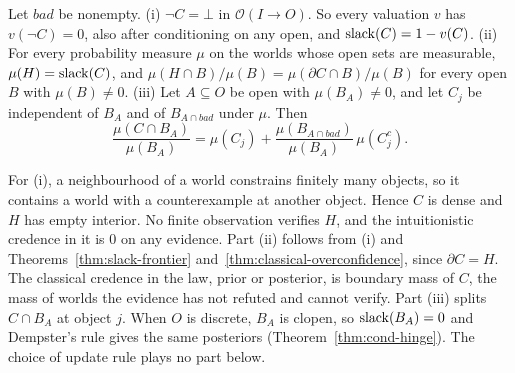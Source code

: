 \begin{theorem}
\label{thm:ravens}
Let $\mathit{bad}$ be nonempty.
(i) $\neg C = \bot$ in $\mathcal{O}(I \to O)$. So every valuation $v$
has $v(\neg C) = 0$, also after conditioning on any open, and
$\mathrm{slack}(C) = 1 - v(C)$.
(ii) For every probability measure $\mu$ on the worlds whose open sets
are measurable, $\mu(H) = \mathrm{slack}(C)$, and
$\mu(H \cap B)/\mu(B) = \mu(\partial C \cap B)/\mu(B)$ for every open
$B$ with $\mu(B) \ne 0$.
(iii) Let $A \subseteq O$ be open with $\mu(B_A) \ne 0$, and let $C_j$ be
independent of $B_A$ and of $B_{A \cap \mathit{bad}}$ under $\mu$. Then
\[
  \frac{\mu(C \cap B_A)}{\mu(B_A)}
  = \mu(C_j) + \frac{\mu(B_{A \cap \mathit{bad}})}{\mu(B_A)}\,
    \mu(C_j^{c}).
\]
\end{theorem}

\noindent
For (i), a neighbourhood of a world constrains finitely many objects, so
it contains a world with a counterexample at another object. Hence $C$
is dense and $H$ has empty interior. No finite observation verifies $H$,
and the intuitionistic credence in it is $0$ on any evidence. Part (ii)
follows from (i) and Theorems~\ref{thm:slack-frontier}
and~\ref{thm:classical-overconfidence}, since $\partial C = H$. The
classical credence in the law, prior or posterior, is boundary mass of
$C$, the mass of worlds the evidence has not refuted and cannot verify.
Part (iii) splits $C \cap B_A$ at object $j$. When $O$ is discrete,
$B_A$ is clopen, so $\mathrm{slack}(B_A) = 0$ and Dempster's rule gives the same
posteriors (Theorem~\ref{thm:cond-hinge}). The choice of update rule
plays no part below.

